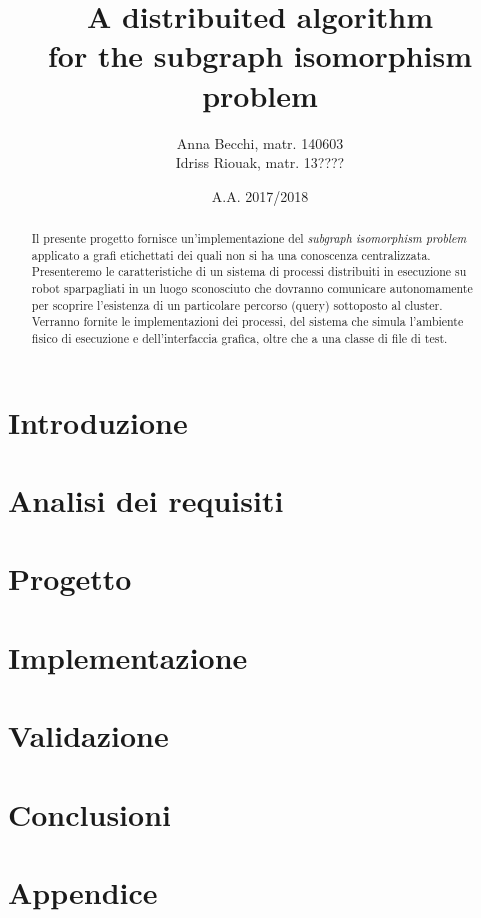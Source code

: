 \documentclass{checkpoint/llncs}
\title{A distribuited algorithm\\for the subgraph isomorphism problem}
\author{Anna Becchi, matr. 140603\\
  Idriss Riouak, matr. 13????}
\institute{Laurea Magistrale in Informatica\\Universit\`a di Udine}
\date{A.A. 2017/2018}
\begin{document}
\maketitle
\begin{abstract}
  Il presente progetto fornisce un'implementazione del
  \emph{subgraph isomorphism problem} applicato a grafi
  etichettati dei quali non si ha una conoscenza centralizzata.
  Presenteremo le caratteristiche di un sistema di processi
  distribuiti in esecuzione su robot sparpagliati in un
  luogo sconosciuto che dovranno comunicare autonomamente
  per scoprire l'esistenza di un particolare percorso
  (query) sottoposto al cluster.
  Verranno fornite le implementazioni dei
  processi, del sistema che simula l'ambiente fisico
  di esecuzione e dell'interfaccia grafica, oltre che a una
  classe di file di test.
\end{abstract}

\section{Introduzione}
\label{ch:intro}


\newpage
\section{Analisi dei requisiti}
\label{ch:analysis}


\newpage
\section{Progetto}
\label{ch:project}


\newpage
\section{Implementazione}
\label{ch:impl}


\newpage
\section{Validazione}
\label{ch:validation}


\newpage
\section{Conclusioni}
\label{ch:conclusions}


\newpage
\appendix

\section{Appendice}
\label{ch:appendix}

\end{document}
